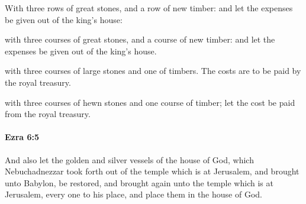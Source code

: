 			With three rows of great stones, and a row of new timber: and let the expenses be given out of the king’s house:

			\begin{versebox}
					\item[BHS] 
					\item[LXX] 
					\item[ASV] with three courses of great stones, and a course of new timber: and let the expenses be given out of the king's house.
					\item[NIV] with three courses of large stones and one of timbers. The costs are to be paid by the royal treasury.
					\item[NRSV] with three courses of hewn stones and one course of timber; let the cost be paid from the royal treasury.
			\end{versebox}

		\paragraph{Ezra 6:5} %
			\label{EZRA-6-5}

			And also let the golden and silver vessels of the house of God, which Nebuchadnezzar took forth out of the temple which is at Jerusalem, and brought unto Babylon, be restored, and brought again unto the temple which is at Jerusalem, every one to his place, and place them in the house of God.

